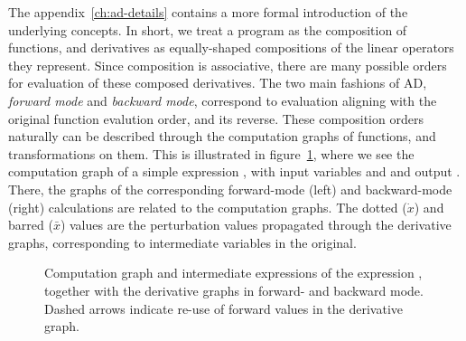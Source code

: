 The appendix~\ref{ch:ad-details} contains a more formal introduction of the underlying concepts.  In
short, we treat a program as the composition of functions, and derivatives as equally-shaped
compositions of the linear operators they represent.  Since composition is associative, there are
many possible orders for evaluation of these composed derivatives.  The two main fashions of AD,
\emph{forward mode} and \emph{backward mode}, correspond to evaluation aligning with the original
function evalution order, and its reverse.  These composition orders naturally can be described
through the computation graphs of functions, and transformations on them.  This is illustrated in
figure~\ref{fig:comp-graph}, where we see the computation graph of a simple expression
, with input variables  and  and output .  There, the
graphs of the corresponding forward-mode (left) and backward-mode (right) calculations are related
to the computation graphs.  The dotted (\(\dot{x}\)) and barred (\(\bar{x}\)) values are the
perturbation values propagated through the derivative graphs, corresponding to intermediate
variables in the original.

\begin{figure}[t]
  \centering
  \qquad
  \caption{Computation graph and intermediate expressions of the expression \protect{}, together with the derivative graphs in forward- and backward mode.  Dashed arrows
    indicate re-use of forward values in the derivative graph.}
  \label{fig:comp-graph}
\end{figure}

